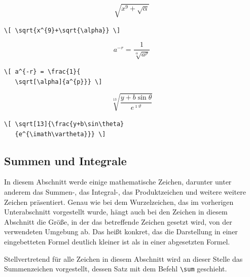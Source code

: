 \documentclass[a4paper,10pt,twoside]{scrbook}
\begin{document}
{\begin{minipage}[c]{.4\textwidth}
\vspace*{-5mm}
\[ \sqrt{x^{9}+\sqrt{\alpha}} \]
\end{minipage}
\hfill
\begin{minipage}[c]{.58\textwidth}
\setlength{\parskip}{1em}
\verb!\[ \sqrt{x^{9}+\sqrt{\alpha}} \] !
\end{minipage}

\begin{minipage}[c]{.4\textwidth}
\vspace*{-5mm}
\[ a^{-r} = \frac{1}{
   \sqrt[\alpha]{a^{p}}} \]
\end{minipage}
\hfill
\begin{minipage}[c]{.58\textwidth}
\setlength{\parskip}{1em}
\verb!\[ a^{-r} = \frac{1}{! \\
\verb!   \sqrt[\alpha]{a^{p}}} \]!
\end{minipage}

\begin{minipage}[c]{.4\textwidth}
\vspace*{-5mm}
\[ \sqrt[13]{\frac{y+b\sin\theta}
   {e^{\imath\vartheta}}} \]
\end{minipage}
\hfill
\begin{minipage}[c]{.58\textwidth}
\setlength{\parskip}{1em}
\verb!\[ \sqrt[13]{\frac{y+b\sin\theta}! \\
\verb!   {e^{\imath\vartheta}}} \]!
\end{minipage}


\subsection{Summen und Integrale}

In diesem Abschnitt werde einige 
mathematische Zeichen, darunter unter anderem 
das Summen-, das Integral-, das Produktzeichen und weitere weitere Zeichen
präsentiert. Genau wie bei dem Wurzelzeichen, das im vorherigen Unterabschnitt vorgestellt wurde, 
hängt auch bei den Zeichen in diesem Abschnitt die Größe, in der das betreffende Zeichen gesetzt wird, 
von der verwendeten Umgebung ab. Das heißt konkret, das die Darstellung in
einer eingebetteten Formel deutlich kleiner ist als in einer abgesetzten Formel.

Stellvertretend für alle Zeichen in diesem Abschnitt wird an dieser Stelle das
Summenzeichen vorgestellt, dessen 
Satz mit dem Befehl \verb!\sum! geschieht.

}
\end{document}

